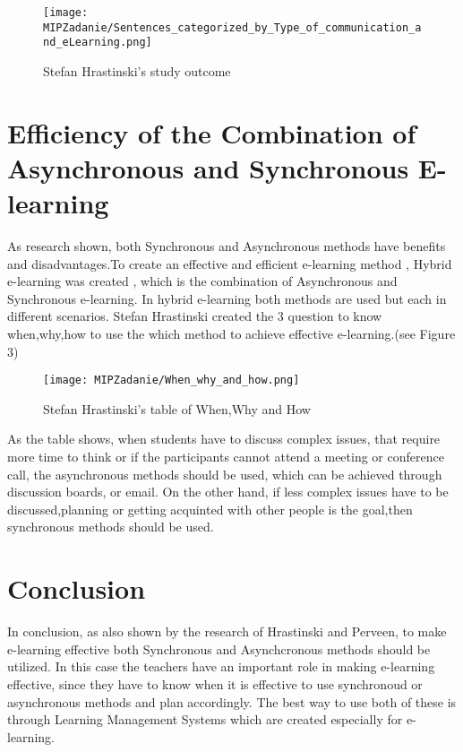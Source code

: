 \documentclass[10pt,twoside,english,a4paper]{article}
\begin{document}
\begin{figure*}[tbh]
\centering
\texttt{[image: MIPZadanie/Sentences\_categorized\_by\_Type\_of\_communication\_and\_eLearning.png]}

\caption{Stefan Hrastinski's study outcome}
\label{f:rozhod}
\end{figure*}
\section{Efficiency of the Combination of Asynchronous and Synchronous E-learning }\label{comb} 
As research shown, both Synchronous and Asynchronous methods have benefits and disadvantages.To create an effective and efficient e-learning method , Hybrid e-learning was created , which is the combination of Asynchronous and Synchronous e-learning.
In hybrid e-learning both methods are used but each in different scenarios. Stefan Hrastinski created the 3 question to know when,why,how to use the which method to achieve effective e-learning.(see Figure 3)
\begin{figure*}[tbh]
\centering
\texttt{[image: MIPZadanie/When\_why\_and\_how.png]}

\caption{Stefan Hrastinski's table of When,Why and How}
\label{f:rozhod}
\end{figure*}

As the table  shows, when students have to discuss complex issues, that require more time to think or if the participants cannot attend a meeting or conference call, the asynchronous methods should be used, which can be achieved through discussion boards, or email. On the other hand, if less complex issues have to be discussed,planning or getting acquinted with other people is the goal,then  synchronous methods should be used.

\section{Conclusion} \label{conc} %
In conclusion, as also shown by the research of Hrastinski and Perveen, to make e-learning effective both Synchronous and Asynchcronous methods should be utilized. In this case the teachers have an important role in making e-learning effective, since they have to know when it is effective to use synchronoud or asynchronous methods and plan accordingly.
The best way to use both of these is through Learning Management Systems which are created especially for e-learning.



\end{document}
